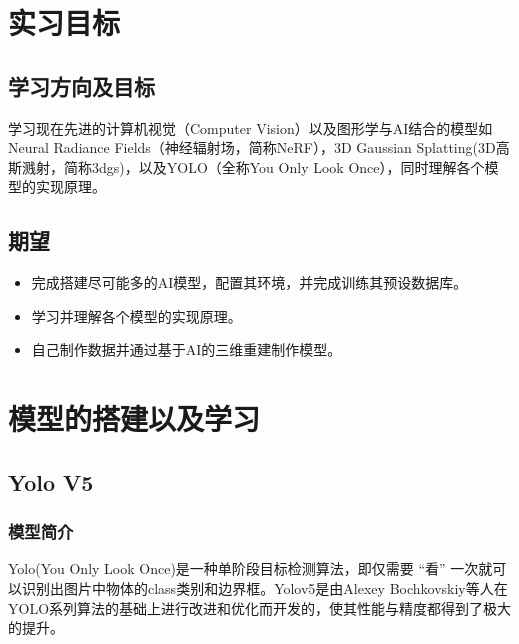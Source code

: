 \documentclass{nwputhesis}
\begin{document}
\maketitle

\newpage
\makecontent

\maketext
\fancyfoot[C]{\thepage}
\pagestyle{fancy}
\section{实习目标}
\subsection{学习方向及目标}
学习现在先进的计算机视觉（Computer Vision）以及图形学与AI结合的模型如Neural Radiance Fields（神经辐射场，简称NeRF），3D Gaussian Splatting(3D高斯溅射，简称3dgs)，以及YOLO（全称You Only Look Once），同时理解各个模型的实现原理。
\subsection{期望}
\begin{itemize}
    \item 完成搭建尽可能多的AI模型，配置其环境，并完成训练其预设数据库。
    \item 学习并理解各个模型的实现原理。
    \item 自己制作数据并通过基于AI的三维重建制作模型。
\end{itemize}
\makespace
\section{模型的搭建以及学习}
\subsection{Yolo V5}
\subsubsection{模型简介}
Yolo(You Only Look Once)是一种单阶段目标检测算法，即仅需要 “看” 一次就可以识别出图片中物体的class类别和边界框。Yolov5是由Alexey Bochkovskiy等人在YOLO系列算法的基础上进行改进和优化而开发的，使其性能与精度都得到了极大的提升。
\end{document}

